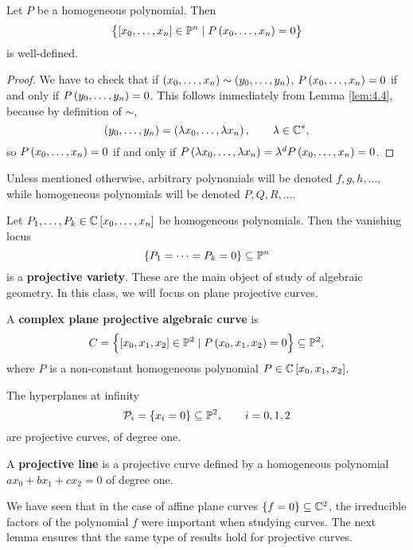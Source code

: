 \begin{proposition}
Let $ P $ be a homogeneous polynomial. Then
$$ \cbr{\sbr{x_0, \dots, x_n} \in \P^n \mid P\br{x_0, \dots, x_n} = 0} $$
is well-defined.
\end{proposition}

\begin{proof}
We have to check that if $ \br{x_0, \dots, x_n} \sim \br{y_0, \dots, y_n} $, $ P\br{x_0, \dots, x_n} = 0 $ if and only if $ P\br{y_0, \dots, y_n} = 0 $. This follows immediately from Lemma \ref{lem:4.4}, because by definition of $ \sim $,
$$ \br{y_0, \dots, y_n} = \br{\lambda x_0, \dots, \lambda x_n}, \qquad \lambda \in \C^*, $$
so $ P\br{x_0, \dots, x_n} = 0 $ if and only if $ P\br{\lambda x_0, \dots, \lambda x_n} = \lambda^dP\br{x_0, \dots, x_n} = 0 $.
\end{proof}

\begin{notation}
Unless mentioned otherwise, arbitrary polynomials will be denoted $ f, g, h, \dots $, while homogeneous polynomials will be denoted $ P, Q, R, \dots $.
\end{notation}

Let $ P_1, \dots, P_k \in \C\sbr{x_0, \dots, x_n} $ be homogeneous polynomials. Then the vanishing locus
$$ \cbr{P_1 = \dots = P_k = 0} \subseteq \P^n $$
is a \textbf{projective variety}. These are the main object of study of algebraic geometry. In this class, we will focus on plane projective curves.

\begin{definition}
A \textbf{complex plane projective algebraic curve} is
$$ C = \cbr{\sbr{x_0, x_1, x_2} \in \P^2 \mid P\br{x_0, x_1, x_2} = 0} \subseteq \P^2, $$
where $ P $ is a non-constant homogeneous polynomial $ P \in \C\sbr{x_0, x_1, x_2} $.
\end{definition}

\begin{example}
The hyperplanes at infinity
$$ \PP_i = \cbr{x_i = 0} \subseteq \P^2, \qquad i = 0, 1, 2 $$
are projective curves, of degree one.
\end{example}

\begin{definition}
A \textbf{projective line} is a projective curve defined by a homogeneous polynomial $ ax_0 + bx_1 + cx_2 = 0 $ of degree one.
\end{definition}

\pagebreak

We have seen that in the case of affine plane curves $ \cbr{f = 0} \subseteq \C^2 $, the irreducible factors of the polynomial $ f $ were important when studying curves. The next lemma ensures that the same type of results hold for projective curves.


